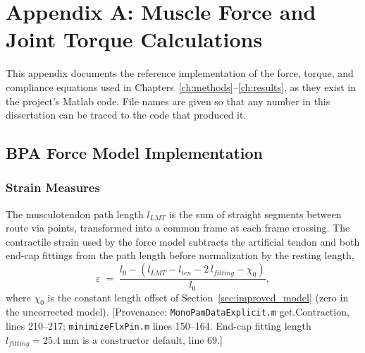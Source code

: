 
\chapter{Appendix A: Muscle Force and Joint Torque Calculations}\label{app:muscle_calcs}

This appendix documents the reference implementation of the force, torque, and
compliance equations used in Chapters~\ref{ch:methods}--\ref{ch:results}, as they
exist in the project's Matlab code. File names are given so that any number in this
dissertation can be traced to the code that produced it.

\section{BPA Force Model Implementation}

\subsection{Strain Measures}
The musculotendon path length $l_{LMT}$ is the sum of straight segments between
route via points, transformed into a common frame at each frame crossing. The
contractile strain used by the force model subtracts the artificial tendon and both
end-cap fittings from the path length before normalization by the resting length,
\begin{equation}
    \varepsilon \;=\; \frac{l_{0} - \left(l_{LMT} - l_{ten} - 2\,l_{fitting} - \chi_{0}\right)}{l_{0}},
    \label{eq:app_strain}
\end{equation}
where $\chi_{0}$ is the constant length offset of
Section~\ref{sec:improved_model} (zero in the uncorrected model).
[Provenance: \texttt{MonoPamDataExplicit.m} get.Contraction, lines 210--217;
\texttt{minimizeFlxPin.m} lines 150--164. End-cap fitting length
$l_{fitting}=\qty{25.4}{\mm}$ is a constructor default, line 69.]

